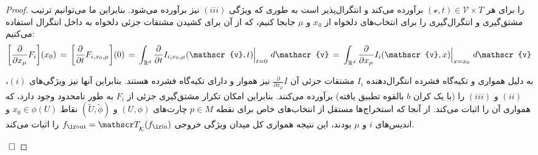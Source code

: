 \begin{proof}
    را برای هر $(\mathscr{v},t) \in \mathscr{V} \times T$
    برآورده می‌کند و انتگرال‌پذیر است به طوری که ویژگی $(iii)$ نیز برآورده می‌شود.
    بنابراین ما می‌توانیم ترتیب مشتق‌گیری و انتگرال‌گیری را برای انتخاب‌های دلخواه از $x_0$ و $\mu$ جابجا کنیم، که از آن برای کشیدن مشتقات جزئی دلخواه به داخل انتگرال استفاده می‌کنیم:
    \begin{align}
        \bigg[ \frac{\partial}{\partial x_\mu} F_i \bigg](x_0)
        \,=\, \bigg[ \frac{\partial}{\partial t} F_{i,x_0,\mu} \bigg](0)
        \,=\, \int_{\R^d} \frac{\partial}{\partial t} I_{i,x_0,\mu}(\mathscr{v},t) \Big|_{t=0}\ d\mathscr{v}
        \,=\, \int_{\R^d} \frac{\partial}{\partial x_\mu} I_i(\mathscr{v},x) \Big|_{x=x_0}\ d\mathscr{v}
    \end{align}

    به دلیل همواری و تکیه‌گاه فشرده انتگرال‌دهنده $I_i$ مشتقات جزئی آن $\frac{\partial}{\partial x_\mu} I$ نیز هموار و دارای تکیه‌گاه فشرده هستند.
    بنابراین آنها نیز ویژگی‌های $(i)$، $(ii)$ و $(iii)$ را (با یک کران $b$ بالقوه تطبیق یافته) برآورده می‌کنند.
    بنابراین امکان تکرار مشتق‌گیری جزئی از $F_i$ به طور نامحدود وجود دارد، که همواری آن را اثبات می‌کند.
    از آنجا که استخراج‌ها مستقل از انتخاب‌های خاص برای نقطه $p\in M$ چارت‌های $(U,\phi)$ و $(\widetilde{U},\widetilde{\phi})$ نقاط $x_0\in\phi(U)$ و اندیس‌های $i$ و $\mu$ بودند، این نتیجه همواری کل میدان ویژگی خروجی $\fout = \TK(\fin)$ را اثبات می‌کند.

\NoEndMark
$~\hfill\Box$
\end{proof}